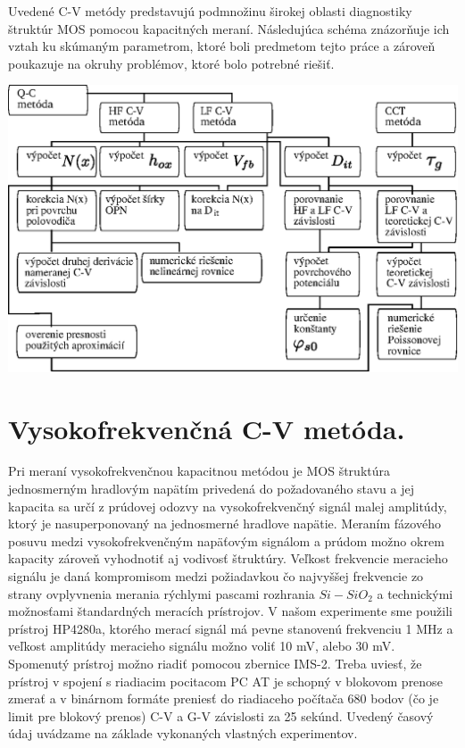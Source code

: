 Uvedené C-V metódy predstavujú podmnožinu širokej oblasti diagnostiky
štruktúr MOS pomocou kapacitných meraní.  Následujúca schéma
znázorňuje ich vztah ku skúmaným parametrom, ktoré boli predmetom
tejto práce a zároveň poukazuje na okruhy problémov, ktoré bolo
potrebné riešiť.

\begin{diagram}
\includegraphics[width=\textwidth,height=\textheight,scale=0.7,keepaspectratio]{Figures/diagram-1.EPS}
\label{diagram:1}
\end{diagram}


\section{Vysokofrekvenčná C-V metóda.}\label{sec:3.1}

Pri meraní vysokofrekvenčnou kapacitnou metódou je MOS štruktúra
jednosmerným hradlovým napätím privedená do požadovaného stavu a jej
kapacita sa určí z prúdovej odozvy na vysokofrekvenčný signál malej
amplitúdy, ktorý je nasuperponovaný na jednosmerné hradlove
napätie. Meraním fázového posuvu medzi vysokofrekvenčným napäťovým
signálom a prúdom možno okrem kapacity zároveň vyhodnotiť aj vodivosť
štruktúry. Veľkost frekvencie meracieho signálu je daná kompromisom
medzi požiadavkou čo najvyššej frekvencie zo strany ovplyvnenia
merania rýchlymi pascami rozhrania $Si-SiO_2$ a technickými možnosťami
štandardných meracích prístrojov.  V našom experimente sme použili
prístroj HP4280a, ktorého merací signál má pevne stanovenú frekvenciu
1 MHz a veľkost amplitúdy meracieho signálu možno voliť 10 mV, alebo
30 mV.  Spomenutý prístroj možno riadiť pomocou zbernice IMS-2. Treba
uviesť, že prístroj v spojení s riadiacim pocitacom PC AT je schopný v
blokovom prenose zmerať a v binárnom formáte preniesť do riadiaceho
počítača 680 bodov (čo je limit pre blokový prenos) C-V a G-V
závislosti za 25 sekúnd.  Uvedený časový údaj uvádzame na základe
vykonaných vlastných experimentov.

